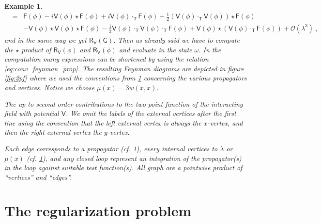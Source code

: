 \documentclass[11pt]{book}
\newcommand{\Ocal}{\mathcal{O}}
\newcommand{\Fsf}{\mathsf{F}}
\newcommand{\Gsf}{\mathsf{G}}
\newcommand{\Rsf}{\mathsf{R}}
\newcommand{\Tsf}{\mathsf{T}}
\newcommand{\Vsf}{\mathsf{V}}
\theoremstyle{break}
\newtheorem{example}{Example}[chapter]
\begin{document}
\begin{example}
\begin{eqnarray*}
&=& \Fsf(\phi) - i \Vsf(\phi) \star \Fsf(\phi) + i \Vsf(\phi) \cdot_\Tsf \Fsf(\phi) + \frac{1}{2} \left( \Vsf(\phi) \cdot_\Tsf\Vsf(\phi) \right) \star \Fsf(\phi) \\
&& - \Vsf(\phi) \star \Vsf(\phi) \star \Fsf(\phi) - \frac{1}{2} \Vsf(\phi) \cdot_\Tsf \Vsf(\phi) \cdot_\Tsf\Fsf(\phi) + \Vsf(\phi) \star \left( \Vsf(\phi) \cdot_\Tsf \Fsf(\phi) \right) + \Ocal(\lambda^3) \ ,
\end{eqnarray*}
%
and in the same way we get $\Rsf_\Vsf(\Gsf)$. Then as already said we have to compute the $\star$ product of $\Rsf_\Vsf(\phi)$ and $\Rsf_\Vsf(\phi)$ and evaluate in the state $\omega$. In the computation many expressions can be shortened by using the relation \eqref{eq:conv_feynman_prop}. The resulting Feynman diagrams are depicted in figure \ref{fig:2pf} where we used the conventions from \ref{fig:prop_vertices} concerning the various propagators and vertices. Notice we choose $\mu(x)=3 w(x,x)$.\par
%
%
\label{fig:prop_vertices}
%
%
The up to second order contributions to the two point function of the interacting field with potential $\Vsf$. We omit the labels of the external vertices after the first line using the convention that the left external vertex is always the $x$-vertex, and then the right external vertex the $y$-vertex.\par
%
%
\label{fig:2pf}
%
%
Each edge corresponds to a propagator (cf. \ref{fig:prop_vertices}), every internal vertices to $\lambda$ or $\mu(x)$ (cf. \ref{fig:prop_vertices}), and any closed loop represent an integration of the propagator(s) in the loop against suitable test function(s). All graph are a pointwise product of ``vertices'' and ``edges''.
\end{example}



\section{The regularization problem}
\label{p:REG_PB}
\end{document}
